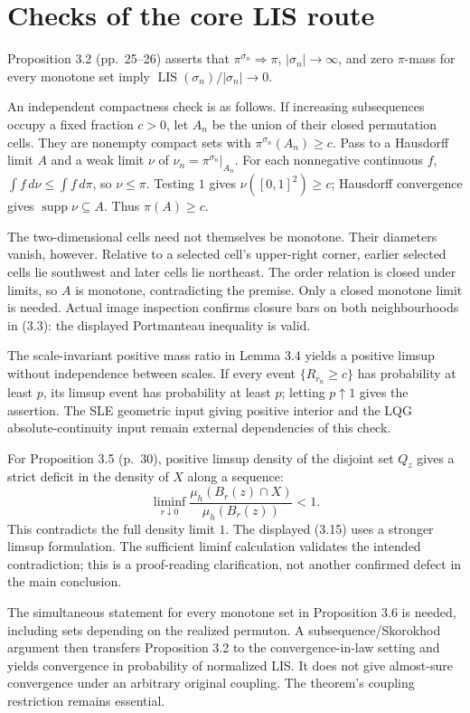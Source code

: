 \documentclass[10pt]{article}
\begin{document}
\section*{Checks of the core LIS route}
Proposition 3.2 (pp. 25–26) asserts that \(\pi^{\sigma_n}\Rightarrow\pi\), \(|\sigma_n|\to\infty\), and zero \(\pi\)-mass for every monotone set imply \(\operatorname{LIS}(\sigma_n)/|\sigma_n|\to0\).\par
An independent compactness check is as follows. If increasing subsequences occupy a fixed fraction \(c>0\), let \(A_n\) be the union of their closed permutation cells. They are nonempty compact sets with \(\pi^{\sigma_n}(A_n)\geq c\). Pass to a Hausdorff limit \(A\) and a weak limit \(\nu\) of \(\nu_n=\pi^{\sigma_n}|_{A_n}\). For each nonnegative continuous \(f\), \(\int f\,d\nu\leq\int f\,d\pi\), so \(\nu\leq\pi\). Testing \(1\) gives \(\nu([0,1]^2)\geq c\); Hausdorff convergence gives \(\operatorname{supp}\nu\subseteq A\). Thus \(\pi(A)\geq c\).\par
The two-dimensional cells need not themselves be monotone. Their diameters vanish, however. Relative to a selected cell’s upper-right corner, earlier selected cells lie southwest and later cells lie northeast. The order relation is closed under limits, so \(A\) is monotone, contradicting the premise. Only a closed monotone limit is needed. Actual image inspection confirms closure bars on both neighbourhoods in (3.3): the displayed Portmanteau inequality is valid.\par
The scale-invariant positive mass ratio in Lemma 3.4 yields a positive limsup without independence between scales. If every event \(\{R_{r_n}\geq c\}\) has probability at least \(p\), its limsup event has probability at least \(p\); letting \(p\uparrow1\) gives the assertion. The SLE geometric input giving positive interior and the LQG absolute-continuity input remain external dependencies of this check.\par
For Proposition 3.5 (p. 30), positive limsup density of the disjoint set \(Q_z\) gives a strict deficit in the density of \(X\) along a sequence: \[\liminf_{r\downarrow0}
 \frac{\mu_h(B_r(z)\cap X)}{\mu_h(B_r(z))}<1.\] This contradicts the full density limit \(1\). The displayed (3.15) uses a stronger limsup formulation. The sufficient liminf calculation validates the intended contradiction; this is a proof-reading clarification, not another confirmed defect in the main conclusion.\par
The simultaneous statement for every monotone set in Proposition 3.6 is needed, including sets depending on the realized permuton. A subsequence/Skorokhod argument then transfers Proposition 3.2 to the convergence-in-law setting and yields convergence in probability of normalized LIS. It does not give almost-sure convergence under an arbitrary original coupling. The theorem’s coupling restriction remains essential.\par
\end{document}
